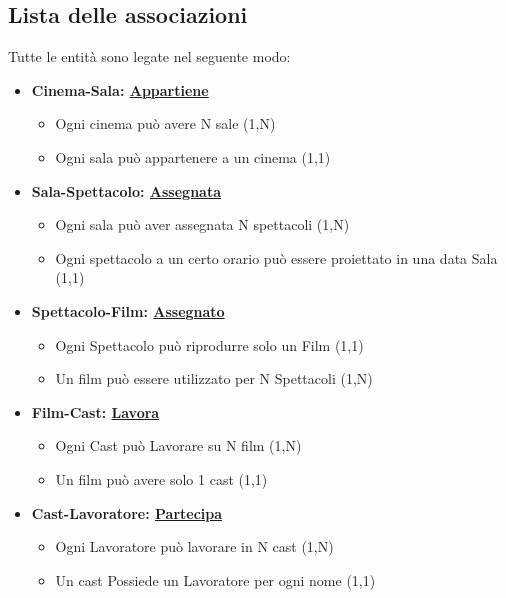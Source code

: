 \documentclass[10pt]{article}
\begin{document}
	\subsection{Lista delle associazioni}
	Tutte le entità sono legate nel seguente modo:
	\begin{itemize}
	    \item {\textbf{Cinema-Sala: \underline{Appartiene}}
		    \begin{itemize}
			    \item Ogni cinema può avere N sale (1,N)
			    \item Ogni sala può appartenere a un cinema (1,1)
		    \end{itemize}}
		    
		\item {\textbf{Sala-Spettacolo: \underline{Assegnata}}
		    \begin{itemize}
			    \item Ogni sala può aver assegnata N spettacoli (1,N)
			    \item Ogni spettacolo a un certo orario può essere proiettato in una data Sala (1,1)
		    \end{itemize}}
		        
		\item {\textbf{Spettacolo-Film: \underline{Assegnato}}
		    \begin{itemize}
			    \item Ogni Spettacolo può riprodurre solo un Film (1,1)
			    \item Un film può essere utilizzato per N Spettacoli (1,N)
		    \end{itemize}}
		    
		\item {\textbf{Film-Cast: \underline{Lavora}}
		    \begin{itemize}
			    \item Ogni Cast può Lavorare su N film (1,N)
			    \item Un film può avere solo 1 cast (1,1)
		    \end{itemize}}
		
		\item {\textbf{Cast-Lavoratore: \underline{Partecipa}}
		    \begin{itemize}
			    \item Ogni Lavoratore può lavorare in N cast (1,N)
			    \item Un cast Possiede un Lavoratore per ogni nome (1,1)
		    \end{itemize}}
		  

\end{itemize}
\end{document}
